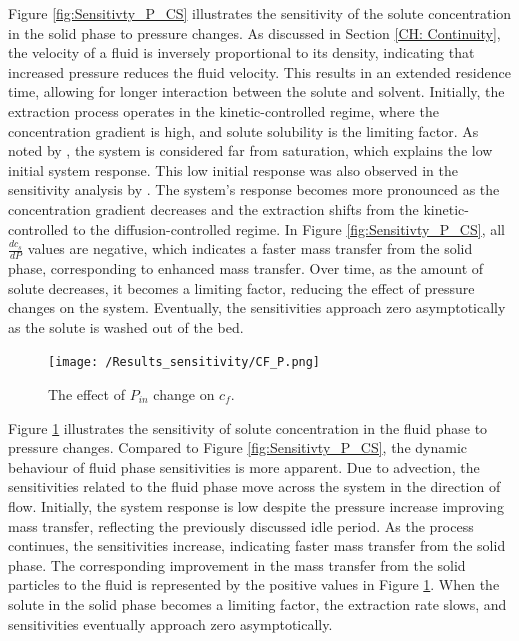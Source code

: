 \documentclass[a4paper,fleqn]{cas-dc}
\begin{document}
	Figure \ref{fig:Sensitivty_P_CS} illustrates the sensitivity of the solute concentration in the solid phase to pressure changes. As discussed in Section \ref{CH: Continuity}, the velocity of a fluid is inversely proportional to its density, indicating that increased pressure reduces the fluid velocity. This results in an extended residence time, allowing for longer interaction between the solute and solvent. Initially, the extraction process operates in the kinetic-controlled regime, where the concentration gradient is high, and solute solubility is the limiting factor. As noted by \citet{Sliczniuk2024}, the system is considered far from saturation, which explains the low initial system response. This low initial response was also observed in the sensitivity analysis by \citet{Fiori_2007}. The system's response becomes more pronounced as the concentration gradient decreases and the extraction shifts from the kinetic-controlled to the diffusion-controlled regime. In Figure \ref{fig:Sensitivty_P_CS}, all $\frac{dc_s}{dP}$ values are negative, which indicates a faster mass transfer from the solid phase, corresponding to enhanced mass transfer.  Over time, as the amount of solute decreases, it becomes a limiting factor, reducing the effect of pressure changes on the system. Eventually, the sensitivities approach zero asymptotically as the solute is washed out of the bed.
	
	\begin{figure}[!ht]
		\centering
		\texttt{[image: /Results\_sensitivity/CF\_P.png]}
		\caption{The effect of $P_{in}$ change on $c_f$.}
		\label{fig:Sensitivty_P_CF}
	\end{figure}
	
	
	Figure \ref{fig:Sensitivty_P_CF} illustrates the sensitivity of solute concentration in the fluid phase to pressure changes. Compared to Figure \ref{fig:Sensitivty_P_CS}, the dynamic behaviour of fluid phase sensitivities is more apparent. Due to advection, the sensitivities related to the fluid phase move across the system in the direction of flow. Initially, the system response is low despite the pressure increase improving mass transfer, reflecting the previously discussed idle period. As the process continues, the sensitivities increase, indicating faster mass transfer from the solid phase. The corresponding improvement in the mass transfer from the solid particles to the fluid is represented by the positive values in Figure \ref{fig:Sensitivty_P_CF}. When the solute in the solid phase becomes a limiting factor, the extraction rate slows, and sensitivities eventually approach zero asymptotically.
	
\end{document}
